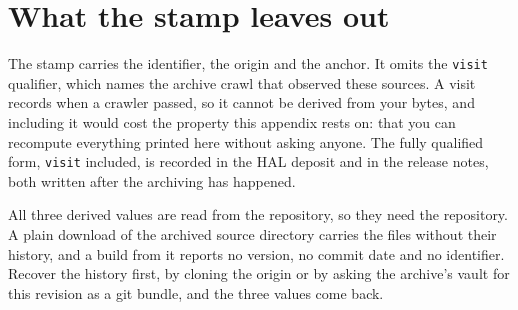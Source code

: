 \section{What the stamp leaves out}

The stamp carries the identifier, the origin and the anchor. It omits the \texttt{visit}
qualifier, which names the archive crawl that observed these sources. A visit records when a
crawler passed, so it cannot be derived from your bytes, and including it would cost the property
this appendix rests on: that you can recompute everything printed here without asking anyone. The
fully qualified form, \texttt{visit} included, is recorded in the HAL deposit and in the release
notes, both written after the archiving has happened.

All three derived values are read from the repository, so they need the repository. A plain
download of the archived source directory carries the files without their history, and a build
from it reports no version, no commit date and no identifier. Recover the history first, by
cloning the origin or by asking the archive's vault for this revision as a git bundle, and the
three values come back.


